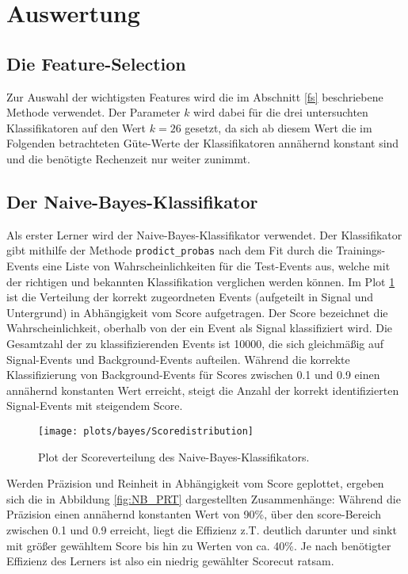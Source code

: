 \section{Auswertung}


\subsection{Die Feature-Selection}

Zur Auswahl der wichtigsten Features wird die im Abschnitt \ref{fs} beschriebene Methode verwendet. Der Parameter $k$ wird dabei für die drei untersuchten Klassifikatoren auf den Wert $k = 26$ gesetzt, da sich ab diesem Wert die im Folgenden betrachteten Güte-Werte der Klassifikatoren annähernd konstant sind und die benötigte Rechenzeit nur weiter zunimmt.


\subsection{Der Naive-Bayes-Klassifikator}

Als erster Lerner wird der Naive-Bayes-Klassifikator verwendet. Der Klassifikator gibt mithilfe der Methode \texttt{prodict\_probas} nach dem Fit durch die Trainings-Events eine Liste von Wahrscheinlichkeiten für die Test-Events aus, welche mit der richtigen und bekannten Klassifikation verglichen werden können. Im Plot \ref{fig:NB_SD} ist die Verteilung der korrekt zugeordneten Events (aufgeteilt in Signal und Untergrund) in Abhängigkeit vom Score aufgetragen. Der Score bezeichnet die Wahrscheinlichkeit, oberhalb von der ein Event als Signal klassifiziert wird. Die Gesamtzahl der zu klassifizierenden Events ist 10000, die sich gleichmäßig auf Signal-Events und Background-Events aufteilen. Während die korrekte Klassifizierung von Background-Events für Scores zwischen 0.1 und 0.9 einen annähernd konstanten Wert erreicht, steigt die Anzahl der korrekt identifizierten Signal-Events mit steigendem Score.

\begin{figure}
	\centering
	\texttt{[image: plots/bayes/Scoredistribution]}
	\caption{Plot der Scoreverteilung des Naive-Bayes-Klassifikators.}
	\label{fig:NB_SD}
\end{figure}

Werden Präzision und Reinheit in Abhängigkeit vom Score geplottet, ergeben sich die in Abbildung \ref{fig:NB_PRT} dargestellten Zusammenhänge: Während die Präzision einen annähernd konstanten Wert von 90\%, über den score-Bereich zwischen 0.1 und 0.9 erreicht, liegt die Effizienz z.T. deutlich darunter und sinkt mit größer gewähltem Score bis hin zu Werten von ca. 40\%. Je nach benötigter Effizienz des Lerners ist also ein niedrig gewählter Scorecut ratsam.


